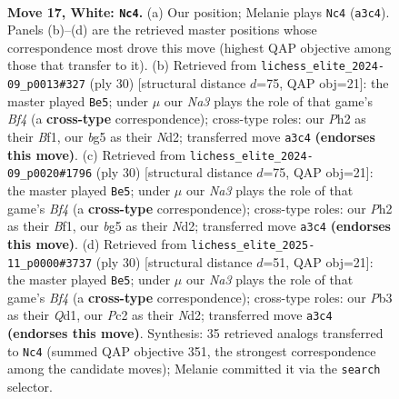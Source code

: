 \documentclass[11pt]{article}
\begin{document}
\clearpage

\begin{figure}[p]\centering
\begin{subfigure}{0.46\textwidth}\centering
\resizebox{\linewidth}{!}{%
\newchessgame
\chessboard[
  setfen={1rb2qk1/p1pp1ppp/3n4/6b1/1p1P4/NP6/P1P2P1P/1RBQ1BK1 w - - 0 17},
  showmover=false,
  pgfstyle=straightmove, color=movearrow, markmove={a3-c4}
]}
\caption{}
\end{subfigure}\hfill
\begin{subfigure}{0.46\textwidth}\centering
\resizebox{\linewidth}{!}{%
\newchessgame
\chessboard[
  setfen={r2qn1k1/ppp2ppp/8/3p1bb1/3P1B2/2P5/PP1NQPPP/R4BK1 w - - 4 16},
  showmover=false,
  pgfstyle=straightmove, color=movearrow, markmove={f4-e5}
]}
\caption{}
\end{subfigure}
\\[4pt]
\begin{subfigure}{0.46\textwidth}\centering
\resizebox{\linewidth}{!}{%
\newchessgame
\chessboard[
  setfen={r2qn1k1/ppp2ppp/8/3p1bb1/3P1B2/2P5/PP1NQPPP/R4BK1 w - - 4 16},
  showmover=false,
  pgfstyle=straightmove, color=movearrow, markmove={f4-e5}
]}
\caption{}
\end{subfigure}\hfill
\begin{subfigure}{0.46\textwidth}\centering
\resizebox{\linewidth}{!}{%
\newchessgame
\chessboard[
  setfen={r2qn1k1/ppp2ppp/8/3p1bb1/3P1B2/2P5/PP1N1PPP/R2Q1BK1 w - - 4 16},
  showmover=false,
  pgfstyle=straightmove, color=movearrow, markmove={f4-e5}
]}
\caption{}
\end{subfigure}
\caption{\textbf{Move 17, White: \texttt{Nc4}.} (a) Our position; Melanie plays \texttt{Nc4} (\texttt{a3c4}). Panels (b)--(d) are the retrieved master positions whose correspondence most drove this move (highest QAP objective among those that transfer to it). (b) Retrieved from \texttt{lichess\_elite\_2024-09\_p0013\#327} (ply 30) [structural distance $d$=75, QAP obj=21]: the master played \texttt{Be5}; under $\mu$ our \emph{Na3} plays the role of that game's \emph{Bf4} (a \textbf{cross-type} correspondence); cross-type roles: our \emph{P}h2 as their \emph{B}f1, our \emph{b}g5 as their \emph{N}d2; transferred move \texttt{a3c4} \textbf{(endorses this move)}. (c) Retrieved from \texttt{lichess\_elite\_2024-09\_p0020\#1796} (ply 30) [structural distance $d$=75, QAP obj=21]: the master played \texttt{Be5}; under $\mu$ our \emph{Na3} plays the role of that game's \emph{Bf4} (a \textbf{cross-type} correspondence); cross-type roles: our \emph{P}h2 as their \emph{B}f1, our \emph{b}g5 as their \emph{N}d2; transferred move \texttt{a3c4} \textbf{(endorses this move)}. (d) Retrieved from \texttt{lichess\_elite\_2025-11\_p0000\#3737} (ply 30) [structural distance $d$=51, QAP obj=21]: the master played \texttt{Be5}; under $\mu$ our \emph{Na3} plays the role of that game's \emph{Bf4} (a \textbf{cross-type} correspondence); cross-type roles: our \emph{P}b3 as their \emph{Q}d1, our \emph{P}c2 as their \emph{N}d2; transferred move \texttt{a3c4} \textbf{(endorses this move)}. Synthesis: 35 retrieved analogs transferred to \texttt{Nc4} (summed QAP objective 351, the strongest correspondence among the candidate moves); Melanie committed it via the \texttt{search} selector.}

\end{figure}
\end{document}
